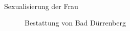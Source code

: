 \documentclass[
  letterpaper,
  DIV=11,
  numbers=noendperiod]{scrartcl}
\makeatletter
\let\oldparagraph\paragraph
\renewcommand{\paragraph}{
    \@ifstar
      \xxxParagraphStar
      \xxxParagraphNoStar
  }
\newcommand{\xxxParagraphStar}[1]{\oldparagraph*{#1}\mbox{}}
\newcommand{\xxxParagraphNoStar}[1]{\oldparagraph{#1}\mbox{}}
\makeatother
\begin{document}
\paragraph{Sexualisierung der Frau}\label{sec-sexualisierung-der-frau}

\begin{figure}


\caption{\label{fig-bestattung-von-bad-duerrenberg}Bestattung von Bad
Dürrenberg}

\end{figure}%
\end{document}
